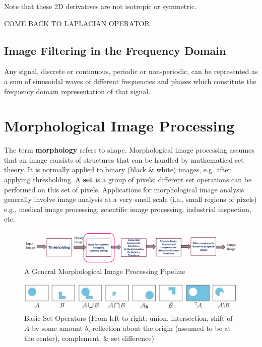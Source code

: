 \documentclass[a4paper,11pt]{article}
\begin{document}
Note that these 2D derivatives are not isotropic or symmetric.

COME BACK TO LAPLACIAN OPERATOR

\subsection{Image Filtering in the Frequency Domain}
Any signal, discrete or continuous, periodic or non-periodic, can be represented as a sum of sinusoidal waves of different frequencies and phases which constitute the frequency domain representation of that signal.

\section{Morphological Image Processing}
The term \textbf{morphology} refers to shape.
Morphological image processing assumes that an image consists of structures that can be handled by mathematical set theory.
It is normally applied to binary (black \& white) images, e.g. after applying thresholding.
A \textbf{set} is a group of pixels; different set operations can be performed on this set of pixels.
Applications for morphological image analysis generally involve image analysis at a very small scale (i.e., small regions of pixels) e.g., medical image processing, scientific image processing, industrial inspection, etc.

\begin{figure}[H]
    \centering
    \includegraphics[width=\textwidth]{images/generalmorphologicalimageprocessingpipeline.png}
    \caption{A General Morphological Image Processing Pipeline}
\end{figure}

\begin{figure}[H]
    \centering
    \includegraphics[width=\textwidth]{images/basicsetoperators.png}
    \caption{Basic Set Operators (From left to right: union, intersection, shift of $A$ by some amount $b$, reflection about the origin (assumed to be at the center), complement, \& set difference)}
\end{figure}
\end{document}
